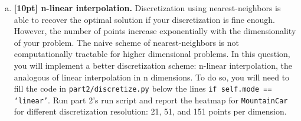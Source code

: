 \documentclass{article}
\begin{document}
\begin{enumerate}[(a)]
\begin{figure}[h!]
\begin{subfigure}{0.3\textwidth}
\caption{Heatmap of the values after 150 iterations of the value iteration algorithm on the \texttt{MountainCar} environment. 
                The state space is discretized in 151 points using the nearest-neighbor interpolation.  \textcolor{red}{My Solutions}}
    \end{subfigure}
\end{figure}

\newpage
\item {\bf [10pt] n-linear interpolation.} Discretization using nearest-neighbors is able to recover the optimal solution if your discretization is fine enough. However, the number of points increase exponentially with the dimensionality of your problem. The naive scheme of nearest-neighbors is not computationally tractable for higher dimensional problems. In this question, you will implement a better discretization scheme: n-linear interpolation, the analogous of linear interpolation in n dimensions. To do so, you will need to fill the code in \texttt{part2/discretize.py} below the lines \texttt{if self.mode == `linear'}. Run part 2's run script and report the heatmap for \texttt{MountainCar} for different discretization resolution: 21, 51, and 151 points per dimension.


\end{enumerate}
\end{document}
